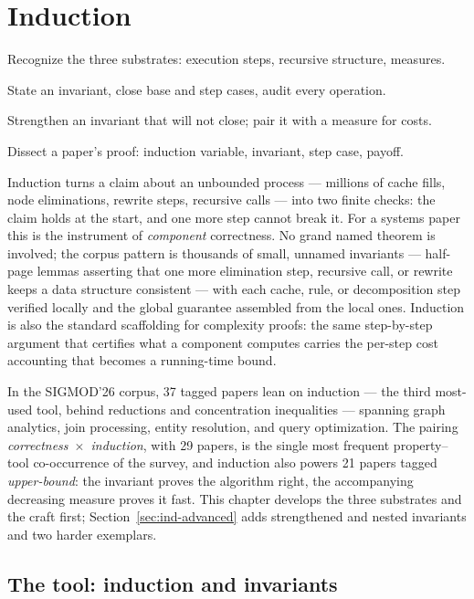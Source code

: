 \chapter{Induction}
\setcounter{section}{-1}   %
\label{ch:ind}

\begin{objectives}
\item Recognize the three substrates: execution steps, recursive structure, measures.
\item State an invariant, close base and step cases, audit every operation.
\item Strengthen an invariant that will not close; pair it with a measure for costs.
\item Dissect a paper's proof: induction variable, invariant, step case, payoff.
\end{objectives}

Induction turns a claim about an unbounded process --- millions of cache fills, node
eliminations, rewrite steps, recursive calls --- into two finite checks: the claim holds
at the start, and one more step cannot break it. For a systems paper this is the
instrument of \emph{component} correctness. No grand named theorem is involved; the
corpus pattern is thousands of small, unnamed invariants --- half-page lemmas asserting
that one more elimination step, recursive call, or rewrite keeps a data structure
consistent --- with each cache, rule, or decomposition step verified locally and the
global guarantee assembled from the local ones. Induction is also the standard
scaffolding for complexity proofs: the same step-by-step argument that certifies what a
component computes carries the per-step cost accounting that becomes a running-time
bound.

In the SIGMOD'26 corpus, 37 tagged papers lean on induction --- the third most-used
tool, behind reductions and concentration inequalities --- spanning graph analytics,
join processing, entity resolution, and query optimization. The pairing
\emph{correctness}~$\times$~\emph{induction}, with 29 papers, is the single most
frequent property--tool co-occurrence of the survey, and induction also powers 21
papers tagged \emph{upper-bound}: the invariant proves the algorithm right, the
accompanying decreasing measure proves it fast. This chapter develops the three
substrates and the craft first; Section~\ref{sec:ind-advanced} adds strengthened and
nested invariants and two harder exemplars.

\section{The tool: induction and invariants}
\label{sec:ind-tool}


